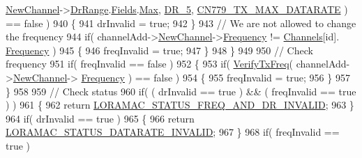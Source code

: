 \begin{DoxyCode}
      \mbox{\hyperlink{structs_channel_add_params_afc31493a105479490228fd896b20b45c}{NewChannel}}->\mbox{\hyperlink{structs_channel_params_ad4d9b041ea740886a05fa8a1d06997a2}{DrRange}}.\mbox{\hyperlink{unionu_dr_range_a5bdb9afc17112f2ae5f9548f0aee964f}{Fields}}.\mbox{\hyperlink{structu_dr_range_1_1s_fields_a5d03c6d792ca60d11ffc7e7a2cb59dd0}{Max}}, \mbox{\hyperlink{group___r_e_g_i_o_n_ga872e12c82020c02a7f70a1c6ed1375df}{DR\_5}}, 
      \mbox{\hyperlink{group___r_e_g_i_o_n_c_n779_gabc1992b9207de536e7b92f2d51e6b7e4}{CN779\_TX\_MAX\_DATARATE}} ) == \textcolor{keyword}{false} )
940         \{
941             drInvalid = \textcolor{keyword}{true};
942         \}
943         \textcolor{comment}{// We are not allowed to change the frequency}
944         \textcolor{keywordflow}{if}( channelAdd->\mbox{\hyperlink{structs_channel_add_params_afc31493a105479490228fd896b20b45c}{NewChannel}}->\mbox{\hyperlink{structs_channel_params_ade3d190636488dad9a89b19446b7acf1}{Frequency}} != \mbox{\hyperlink{_region_c_n779_8c_ad43b16563c3a87159ec34d1db860a3da}{Channels}}[\textcolor{keywordtype}{id}].
      \mbox{\hyperlink{structs_channel_params_ade3d190636488dad9a89b19446b7acf1}{Frequency}} )
945         \{
946             freqInvalid = \textcolor{keyword}{true};
947         \}
948     \}
949 
950     \textcolor{comment}{// Check frequency}
951     \textcolor{keywordflow}{if}( freqInvalid == \textcolor{keyword}{false} )
952     \{
953         \textcolor{keywordflow}{if}( \mbox{\hyperlink{_region_c_n779_8c_af6b3cfa164d4105815aaaa55f02d723e}{VerifyTxFreq}}( channelAdd->\mbox{\hyperlink{structs_channel_add_params_afc31493a105479490228fd896b20b45c}{NewChannel}}->
      \mbox{\hyperlink{structs_channel_params_ade3d190636488dad9a89b19446b7acf1}{Frequency}} ) == \textcolor{keyword}{false} )
954         \{
955             freqInvalid = \textcolor{keyword}{true};
956         \}
957     \}
958 
959     \textcolor{comment}{// Check status}
960     \textcolor{keywordflow}{if}( ( drInvalid == \textcolor{keyword}{true} ) && ( freqInvalid == \textcolor{keyword}{true} ) )
961     \{
962         \textcolor{keywordflow}{return} \mbox{\hyperlink{group___l_o_r_a_m_a_c_gga1d18f26b344040b3ec5c3db662919661a163a1a739baee13607068af42f2e9d30}{LORAMAC\_STATUS\_FREQ\_AND\_DR\_INVALID}};
963     \}
964     \textcolor{keywordflow}{if}( drInvalid == \textcolor{keyword}{true} )
965     \{
966         \textcolor{keywordflow}{return} \mbox{\hyperlink{group___l_o_r_a_m_a_c_gga1d18f26b344040b3ec5c3db662919661aa910e51ef7a7cf64c27dd3ffe5eb9d38}{LORAMAC\_STATUS\_DATARATE\_INVALID}};
967     \}
968     \textcolor{keywordflow}{if}( freqInvalid == \textcolor{keyword}{true} )

\end{DoxyCode}
